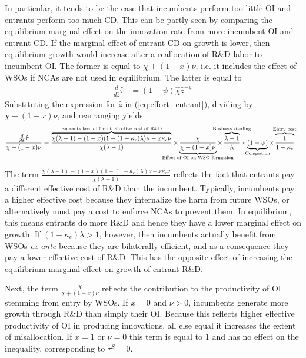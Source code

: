 \documentclass[11pt,english]{article}
\begin{document}
In particular, it tends to be the case that incumbents perform too little OI and entrants perform too much CD. This can be partly seen by comparing the equilibrium marginal effect on the innovation rate from more incumbent OI and entrant CD. If the marginal effect of entrant CD on growth is lower, then equilibrium growth would increase after a reallocation of R\&D labor to incumbent OI. The former is equal to $\chi + (1-x) \nu$, i.e. it includes the effect of WSOs if NCAs are not used in equilibrium. The latter is equal to 
\begin{align}
\frac{d}{d\hat{z}} \hat{\tau} &= (1-\psi) \hat{\chi} \hat{z}^{-\psi} \label{eq:marginal_effect_effort_entrant}
\end{align}
%
Substituting the expression for $\hat{z}$ in (\ref{eq:effort_entrant}), dividing by $\chi + (1-x)\nu$, and rearranging yields 
\begin{align}
	\frac{\frac{d}{d\hat{z}} \hat{\tau}}{\chi + (1-x)\nu} &= \overbrace{\frac{\chi(\lambda-1) -(1-x) (1-(1-\kappa_e)\lambda)\nu - x \kappa_c \nu}{\chi(\lambda-1)}}^{\mathclap{\text{Entrants face different effective cost of R\&D}}} \times \underbrace{\frac{\chi}{\chi + (1-x)\nu}}_{\mathclap{\text{Effect of OI on WSO formation}}} \times \overbrace{\frac{\lambda-1}{\lambda}}^{\mathclap{\text{Business stealing}}} \times  \underbrace{(1-\psi)}_{\mathclap{\text{Congestion}}} \times \overbrace{\frac{1}{1-\kappa_{e}}}^{\mathclap{\text{Entry cost}}} \label{cs:growth_misallocation_condition}
\end{align}

The term $\frac{\chi(\lambda-1) -(1-x) (1-(1-\kappa_e)\lambda)\nu - x \kappa_c \nu}{\chi(\lambda-1)}$ reflects the fact that entrants pay a different effective cost of R\&D than the incumbent. Typically, incumbents pay a higher effective cost because they internalize the harm from future WSOs, or alternatively must pay a cost to enforce NCAs to prevent them. In equilibrium, this means entrants do more R\&D and hence they have a lower marginal effect on growth. If $(1-\kappa_e) \lambda > 1$, however, then incumbents actually benefit from WSOs \textit{ex ante} because they are bilaterally efficient, and as a consequence they pay a lower effective cost of R\&D. This has the opposite effect of increasing the equilibrium marginal effect on growth of entrant R\&D. 

Next, the term $\frac{\chi}{\chi + (1-x)\nu}$ reflects the contribution to the productivity of OI stemming from entry by WSOs. If $x = 0$ and $\nu > 0$, incumbents generate more growth through R\&D than simply their OI. Because this reflects higher effective productivity of OI in producing innovations, all else equal it increases the extent of misallocation. If $x = 1$ or $\nu = 0$ this term is equal to 1 and has no effect on the inequality, corresponding to $\tau^S = 0$.
\end{document}
